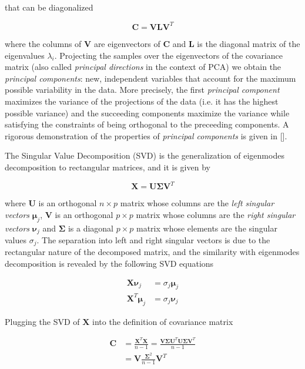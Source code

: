 \documentclass{revtex4-1}
\begin{document}
that can be diagonalized

\begin{equation}
\mathbf{C} = \mathbf{V L V}^T
\end{equation}

where the columns of \(\mathbf{V}\) are eigenvectors of \(\mathbf{C}\) and \(\mathbf{L}\) is the diagonal matrix of the eigenvalues \(\lambda_i\). Projecting the samples over the eigenvectors of the covariance matrix (also called \textit{principal directions} in the context of PCA) we obtain the \textit{principal components}: new, independent variables that account for the maximum possible variability in the data. More precisely, the first \textit{principal component} maximizes the variance of the projections of the data (i.e. it has the highest possible variance) and the succeeding components maximize the variance while satisfying the constraints of being orthogonal to the preceeding components. A rigorous demonstration of the properties of \textit{principal components} is given in [].

The Singular Value Decomposition (SVD) is the generalization of eigenmodes decomposition to rectangular matrices, and it is given by

\begin{equation}
\mathbf{X} = \mathbf{U \Sigma} \mathbf{V}^T
\end{equation}

where \(\mathbf{U}\) is an orthogonal \(n \times p\)  matrix whose columns are the \textit{left singular vectors} \(\mathbf{\mu}_j \), \(\mathbf{V}\) is an orthogonal \(p \times p\) matrix whose columns are the \textit{right singular vectors} \( \mathbf{\nu}_j \) and \( \mathbf{\Sigma} \) is a diagonal \(p \times p\) matrix whose elements are the singular values \(\sigma_j\). The separation into left and right singular vectors is due to the rectangular nature of the decomposed matrix, and the similarity with eigenmodes decomposition is revealed by the following SVD equations

\begin{align}
\mathbf{X} \mathbf{\nu}_j & = \sigma_j \mathbf{\mu}_j \\
\mathbf{X}^T \mathbf{\mu}_j & = \sigma_j \mathbf{\nu}_j
\end{align}

Plugging the SVD of \(\mathbf{X}\) into the definition of covariance matrix

\begin{align}
\mathbf{C} & = \frac{\mathbf{X}^T \mathbf{X}}{n-1} = \frac{\mathbf{V \Sigma U}^T \mathbf{U \Sigma V}^T}{n-1}  \\ \nonumber
& = \mathbf{V} \frac{\mathbf{\Sigma}^2}{n-1} \mathbf{V}^T \nonumber 
\end{align}
\end{document}
